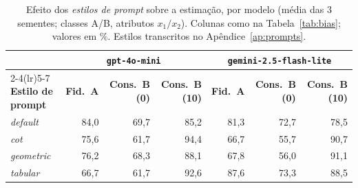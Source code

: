 \documentclass[12pt,a4paper]{article}
\begin{document}
\begin{table}[ht]
\centering
\caption{Efeito dos \emph{estilos de prompt} sobre a estimação, por modelo (média das $3$
sementes; classes A/B, atributos $x_1/x_2$). Colunas como na Tabela~\ref{tab:bias};
valores em \%. Estilos transcritos no Apêndice~\ref{ap:prompts}.}
\label{tab:bias_prompt}
\footnotesize
\setlength{\tabcolsep}{5pt}
\begin{tabular}{lrrrrrr}
\toprule
& \multicolumn{3}{c}{\textbf{\texttt{gpt-4o-mini}}} &
\multicolumn{3}{c}{\textbf{\texttt{gemini-2.5-flash-lite}}} \\
\cmidrule(lr){2-4}\cmidrule(lr){5-7}
\textbf{Estilo de prompt} & \textbf{Fid.\ A} & \textbf{Cons.\ B (0)} &
\textbf{Cons.\ B (10)} &
\textbf{Fid.\ A} & \textbf{Cons.\ B (0)} & \textbf{Cons.\ B (10)} \\
\midrule
\emph{default}   & 84,0 & 69,7 & 85,2 & 81,3 & 72,7 & 78,5 \\
\emph{cot}       & 75,6 & 61,7 & 94,4 & 66,7 & 55,7 & 90,7 \\
\emph{geometric} & 76,2 & 68,3 & 88,1 & 67,8 & 56,0 & 91,1 \\
\emph{tabular}   & 66,7 & 61,7 & 92,6 & 87,6 & 73,3 & 88,5 \\
\bottomrule
\end{tabular}
\end{table}
\end{document}
